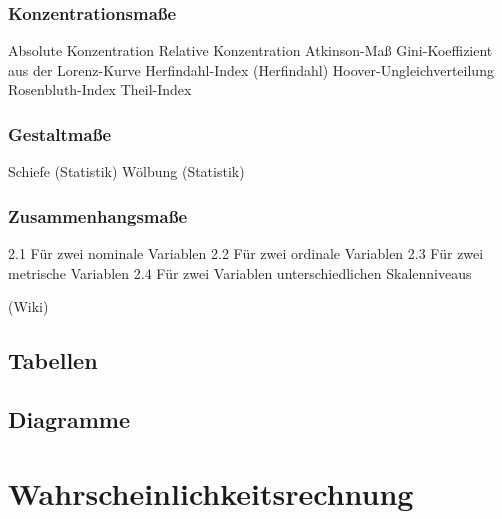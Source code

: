 \documentclass[10pt]{article}
\begin{document}
\subsubsection{Konzentrationsmaße}


    Absolute Konzentration
    Relative Konzentration
    Atkinson-Maß
    Gini-Koeffizient aus der Lorenz-Kurve
    Herfindahl-Index (Herfindahl)
    Hoover-Ungleichverteilung
    Rosenbluth-Index
    Theil-Index


\subsubsection{Gestaltmaße}


    Schiefe (Statistik)
    Wölbung (Statistik)


\subsubsection{Zusammenhangsmaße}


    2.1 Für zwei nominale Variablen
    2.2 Für zwei ordinale Variablen
    2.3 Für zwei metrische Variablen
    2.4 Für zwei Variablen unterschiedlichen Skalenniveaus

(Wiki)

\subsection{Tabellen}

\subsection{Diagramme}





\section{Wahrscheinlichkeitsrechnung}




\end{document}
